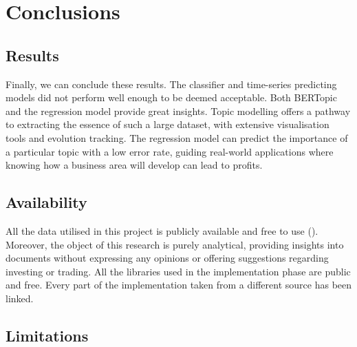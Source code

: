 \documentclass[12pt,MSc,a4paper,oneside]{muthesis}
\begin{document}
\chapter{Conclusions}

\section{Results}

Finally, we can conclude these results. The classifier and time-series predicting models did not perform well enough to be deemed acceptable. Both BERTopic and the regression model provide great insights. Topic modelling offers a pathway to extracting the essence of such a large dataset, with extensive visualisation tools and evolution tracking. The regression model can predict the importance of a particular topic with a low error rate, guiding real-world applications where knowing how a business area will develop can lead to profits.

\section{Availability}

All the data utilised in this project is publicly available and free to use (\cite{sec-data-policy}). Moreover, the object of this research is purely analytical, providing insights into documents without expressing any opinions or offering suggestions regarding investing or trading. All the libraries used in the implementation phase are public and free. Every part of the implementation taken from a different source has been linked.

\section{Limitations}
\end{document}
